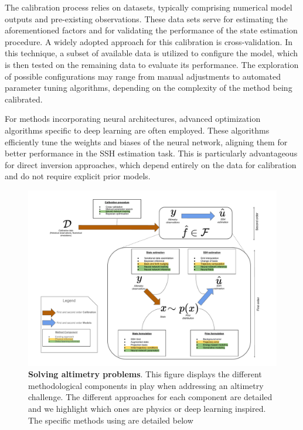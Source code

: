 \begin{bibunit}
The calibration process relies on datasets, typically comprising numerical model outputs and pre-existing observations. These data sets serve for estimating the aforementioned factors and for validating the performance of the state estimation procedure.
A widely adopted approach for this calibration is cross-validation. In this technique, a subset of available data is utilized to configure the model, which is then tested on the remaining data to evaluate its performance. The exploration of possible configurations may range from manual adjustments to automated parameter tuning algorithms, depending on the complexity of the method being calibrated.

For methods incorporating neural architectures, advanced optimization algorithms specific to deep learning are often employed. These algorithms efficiently tune the weights and biases of the neural network, aligning them for better performance in the SSH estimation task. This is particularly advantageous for direct inversion approaches, which depend entirely on the data for calibration and do not require explicit prior models.

\begin{figure}[h]
    \centering
    \includegraphics[width=\textwidth]{00_LitReview/Methodology.pdf}
    \caption{\textbf{Solving altimetry problems}. This figure displays the different methodological components in play when addressing an altimetry challenge. The different approaches for each component are detailed and we highlight which ones are physics or deep learning inspired. The specific methods using are detailed below}
    \label{c2fig:method}
\end{figure}



\end{bibunit}
